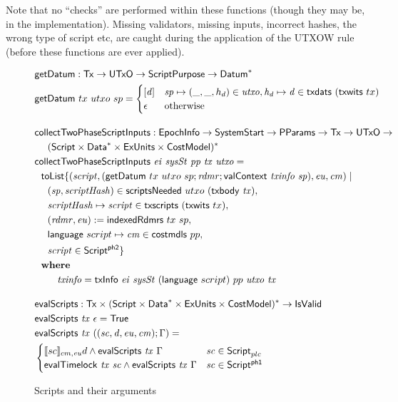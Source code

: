Note that no ``checks'' are performed within these functions (though they may be,
in the implementation).
Missing validators, missing inputs, incorrect hashes, the wrong type of script etc,
are caught during the application of the UTXOW rule (before these functions are ever applied).

\begin{figure}[htb]
  \begin{align*}
    & \fun{getDatum} : \Tx \to \UTxO \to \ScriptPurpose \to \seqof{\Datum} \\
    & \fun{getDatum}~{tx}~{utxo}~{sp} = 
      \begin{cases}
        [\var{d}] & \var{sp} \mapsto (\_, \_, h_d) \in \var{utxo}, \var{h_d}\mapsto \var{d} \in \fun{txdats}~(\fun{txwits}~tx) \\
        \epsilon  & \text{otherwise}
      \end{cases}
    \nextdef
    & \fun{collectTwoPhaseScriptInputs} : \EpochInfo \to \SystemStart \to \PParams \to \Tx \to \UTxO \to \\
    & ~~~~ \seqof{(\Script \times \seqof{\Data} \times \ExUnits \times \CostMod)} \\
    & \fun{collectTwoPhaseScriptInputs} ~\var{ei}~\var{sysSt}~\var{pp}~\var{tx}~ \var{utxo}  =  \\
    & ~~\fun{toList} \{ (\var{script}, (\fun{getDatum}~tx~utxo~sp ; \var{rdmr};\fun{valContext}~\var{txinfo}~\var{sp}), \var{eu}, \var{cm}) \mid \\
    & ~~~~(\var{sp}, \var{scriptHash}) \in \fun{scriptsNeeded}~{utxo}~{(\txbody{tx})}, \\
    & ~~~~\var{scriptHash}\mapsto \var{script}\in \fun{txscripts}~(\fun{txwits}~tx), \\
    & ~~~~(\var{rdmr}, \var{eu}) := \fun{indexedRdmrs}~tx~sp, \\
    & ~~~~\fun{language}~{script} \mapsto \var{cm} \in \fun{costmdls}~{pp}, \\
    & ~~~~\var{script} \in \ScriptPhTwo \} \\
    & \where \\
    & ~~~~~~~ \var{txinfo} = \fun{txInfo}~\var{ei}~\var{sysSt}~(\fun{language}~{script})~{pp}~\var{utxo}~\var{tx}
    \nextdef
    & \fun{evalScripts} : \Tx \times \seqof{(\Script \times \seqof{\Data} \times \ExUnits \times \CostMod)} \to \IsValid \\
    & \fun{evalScripts}~\var{tx}~\epsilon = \True \\
    & \fun{evalScripts}~\var{tx}~((\var{sc}, \var{d}, \var{eu}, \var{cm});\Gamma) = \\
      & \begin{cases}
        \llbracket sc \rrbracket_{cm,\var{eu}} d \land \fun{evalScripts}~\var{tx}~\Gamma & \var{sc}\in\ScriptPlutus \\
        \fun{evalTimelock}~\var{tx}~\var{sc} \land \fun{evalScripts}~\var{tx}~\Gamma & \var{sc}\in\ScriptPhOne
      \end{cases}
  \end{align*}
  \caption{Scripts and their arguments}
  \label{fig:functions:script2}
\end{figure}

